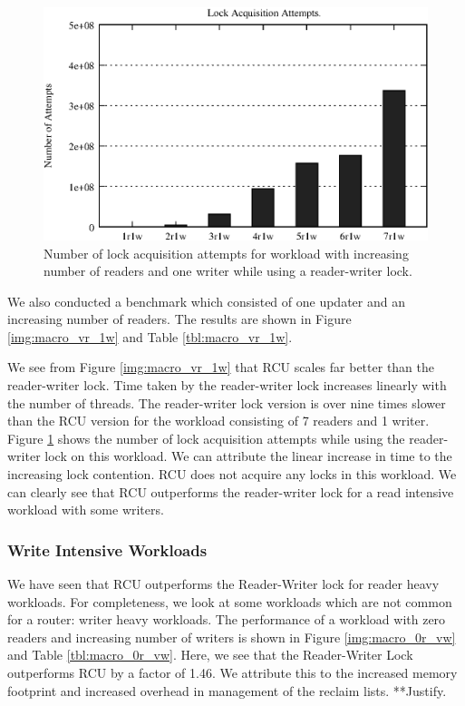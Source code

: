 \documentclass[a4paper,marginparwidth=50pt,marginparsep=10pt]{article}
\begin{document}
\begin{figure}[tph]
\includegraphics[scale = 0.7]{../images/graphs/profile_lockcount_macro_rwl_vr_1w}
\caption{Number of lock acquisition attempts for workload with increasing number of readers and one writer while using a reader-writer lock.}
\label{img:profile_rwl_locks_vr_1w}
\end{figure}

We also conducted a benchmark which consisted of one updater and an
increasing number of readers. The results are shown in Figure
\ref{img:macro_vr_1w} and Table \ref{tbl:macro_vr_1w}.

We see from Figure \ref{img:macro_vr_1w} that RCU scales far better
than the reader-writer lock. Time taken by the reader-writer lock
increases linearly with the number of threads. The reader-writer lock
version is over nine times slower than the RCU version for the
workload consisting of 7 readers and 1 writer. Figure \ref{img:profile_rwl_locks_vr_1w} shows the number of lock acquisition attempts while using the reader-writer lock on this workload. We can attribute the linear increase in time to the increasing lock contention. RCU does not acquire any locks in this workload. We can clearly see that RCU
outperforms the reader-writer lock for a read intensive workload with some writers.

\subsubsection{Write Intensive Workloads}
We have seen that RCU outperforms the Reader-Writer lock for reader heavy workloads. For completeness, we look at some workloads which are not common for a router: writer heavy workloads. The performance of a workload with zero readers and increasing number of writers is shown in  Figure \ref{img:macro_0r_vw} and Table \ref{tbl:macro_0r_vw}. Here, we see that the Reader-Writer Lock outperforms RCU by a factor of 1.46. We attribute this to the increased memory footprint and increased overhead in management of the reclaim lists. **Justify.
\end{document}
